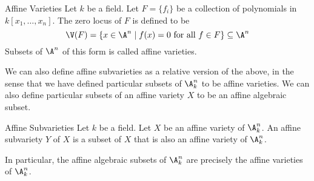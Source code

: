 \documentclass[a4paper]{article}
\begin{document}
\begin{defn}{Affine Varieties}{} Let $k$ be a field. Let $F=\{f_i\}$ be a collection of polynomials in $k[x_1,\dots,x_n]$. The zero locus of $F$ is defined to be $$\V(F)=\{x\in\A^n\;|\;f(x)=0\text{ for all }f\in F\}\subseteq\A^n$$ Subsets of $\A^n$ of this form is called affine varieties. 
\end{defn}

We can also define affine subvarieties as a relative version of the above, in the sense that we have defined particular subsets of $\A_k^n$ to be affine varieties. We can also define particular subsets of an affine variety $X$ to be an affine algebraic subset. 

\begin{defn}{Affine Subvarieties}{} Let $k$ be a field. Let $X$ be an affine variety of $\A_k^n$. An affine subvariety $Y$ of $X$ is a subset of $X$ that is also an affine variety of $\A_k^n$. 
\end{defn}

In particular, the affine algebraic subsets of $\A_k^n$ are precisely the affine varieties of $\A_k^n$. 
\end{document}

